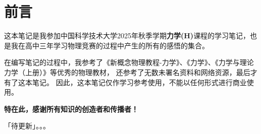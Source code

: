 \chapter{前言}

这本笔记是我参加中国科学技术大学2025年秋季学期\textbf{力学(H)}课程的学习笔记，也是我在高中三年学习物理竞赛的过程中产生的所有的感悟的集合。

在编写笔记的过程中，我参考了《新概念物理教程-力学》\cite{zhaokaihua2004}、《力学》\cite{shuyousheng2005}、《力学与理论力学（上册）》\cite{yangweihong2025}等优秀的物理教材，
还参考了无数未署名资料和网络资源，最后才有了这本笔记。
因此，这本笔记仅作学习参考使用，不能以任何形式进行商业使用。

\begin{center}
    \large\textbf{特在此，感谢所有知识的创造者和传播者！}
\end{center}

「待更新」。。。


